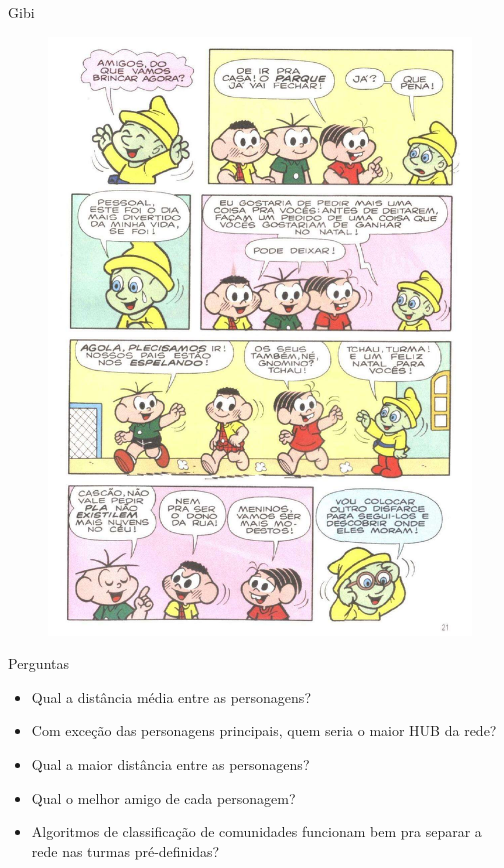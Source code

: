 \documentclass{beamer}
\begin{document}
\begin{frame}{Gibi}
\begin{figure}
    \includegraphics[scale = 0.25]{img/page.pdf}
\end{figure}
\end{frame}

\begin{frame}{Perguntas}
\begin{itemize}
    \item Qual a distância média entre as personagens?
    \vspace{12pt}
    
    \item Com exceção das personagens principais, quem seria o maior HUB da rede?
    \vspace{12pt}
    
    \item Qual a maior distância entre as personagens?
    \vspace{12pt}
    
    \item Qual o melhor amigo de cada personagem?
    \vspace{12pt}
    
    \item Algoritmos de classificação de comunidades funcionam bem pra separar a rede nas turmas pré-definidas?
\end{itemize}
\end{frame}
\end{document}
